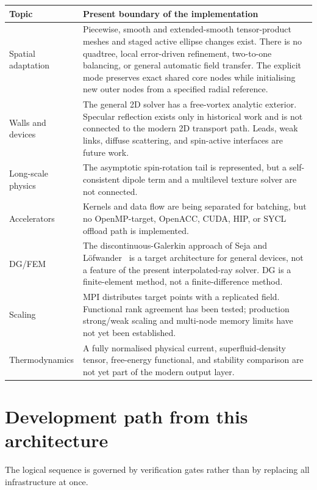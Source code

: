 \documentclass[11pt,a4paper]{article}
\newcommand{\code}[1]{\texttt{\detokenize{#1}}}
\begin{document}
\begin{tabularx}{\textwidth}{>{\raggedright\arraybackslash}p{34mm}X}
\toprule
Topic & Present boundary of the implementation\\
\midrule
Spatial adaptation & Piecewise, smooth and extended-smooth tensor-product meshes and staged active
ellipse changes exist.  There is no quadtree, local error-driven refinement,
two-to-one balancing, or general automatic field transfer. The explicit \code{restart_core} mode
preserves exact shared core nodes while initialising new outer nodes from a
specified radial reference.\\
Walls and devices & The general 2D solver has a free-vortex analytic exterior.
Specular reflection exists only in historical work and is not connected to
the modern 2D transport path.  Leads, weak links, diffuse scattering, and
spin-active interfaces are future work.\\
Long-scale physics & The asymptotic spin-rotation tail is represented, but a
self-consistent dipole term and a multilevel texture solver are not connected.\\
Accelerators & Kernels and data flow are being separated for batching, but no
OpenMP-target, OpenACC, CUDA, HIP, or SYCL offload path is implemented.\\
DG/FEM & The discontinuous-Galerkin approach of Seja and
Löfwander~\cite{seja2022} is a target architecture for general devices, not a
feature of the present interpolated-ray solver.  DG is a finite-element method,
not a finite-difference method.\\
Scaling & MPI distributes target points with a replicated field.  Functional
rank agreement has been tested; production strong/weak scaling and
multi-node memory limits have not yet been established.\\
Thermodynamics & A fully normalised physical current, superfluid-density
tensor, free-energy functional, and stability comparison are not yet part of
the modern output layer.\\
\bottomrule
\end{tabularx}

\section{Development path from this architecture}

The logical sequence is governed by verification gates rather than by replacing
all infrastructure at once.
\end{document}
